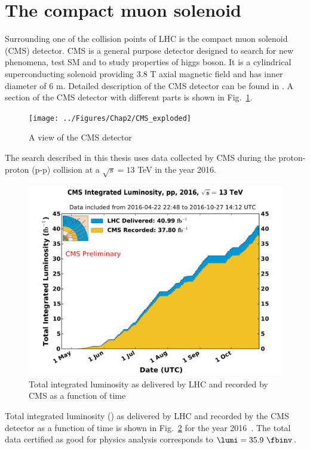 \section{The compact muon solenoid}
Surrounding one of the collision points of LHC is the compact muon solenoid (CMS) detector. CMS is a general purpose detector designed to search for new phenomena, test SM and to study properties of higgs boson. It is a cylindrical superconducting solenoid providing 3.8 T axial magnetic field and has inner diameter of 6 m. Detailed description of the CMS detector can be found in \cite{Chatrchyan:2008aa}. A section of the CMS detector with different parts is shown in Fig.~\ref{fig:CMS_exploded}.
\begin{figure}[h!]
\centering
\texttt{[image: ../Figures/Chap2/CMS\_exploded]}
\caption[CMS detector view]{A view of the CMS detector}
\label{fig:CMS_exploded}
\end{figure}
The search described in this thesis uses data collected by CMS during the proton-proton (p-p) collision at a $\sqrt{s}=13$ TeV in the year 2016.
\begin{figure}[h!]
\centering
\includegraphics[width=0.7\linewidth]{../Figures/Chap2/int_lumi_per_day_cumulative_pp_2016}
\caption[Integrated luminosity of data]{Total integrated luminosity as delivered by LHC and recorded by CMS as a function of time}
\label{fig:int_lumi_per_day_cumulative_pp_2016}
\end{figure}
Total integrated luminosity (\lumi) as delivered by LHC and recorded by the CMS detector as a function of time is shown in Fig.~\ref{fig:int_lumi_per_day_cumulative_pp_2016} for the year 2016~\cite{lumicms}. The total data certified as good for physics analysis corresponds to $\lumi = 35.9\ \fbinv$.
